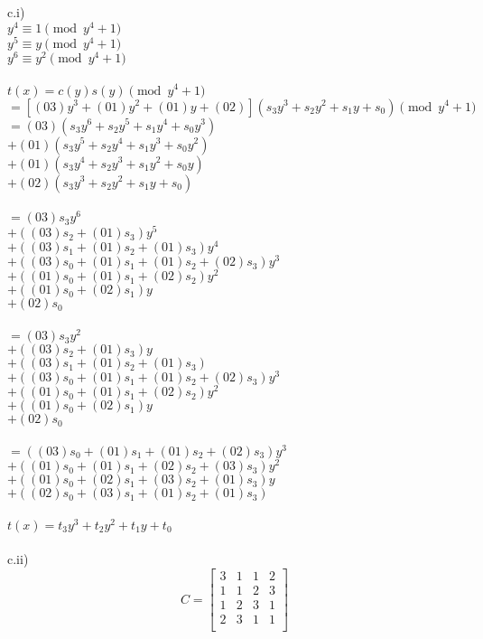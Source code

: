 \documentclass{assignment}
\begin{document}
\begin{problemlist}
\begin{problem}
\begin{answer}
c.i)\\
$y^4\equiv 1 \pmod {y^4+1}$\\
$y^5\equiv y \pmod {y^4+1}$\\
$y^6\equiv y^2 \pmod {y^4+1}$\\
\\
$t(x)=c(y)s(y) \pmod {y^4+1}$\\
$=[(03)y^3+(01)y^2+(01)y+(02)](s_3y^3+s_2y^2+s_1y+s_0) \pmod {y^4+1}$\\
$=(03)(s_3y^6+s_2y^5+s_1y^4+s_0y^3)$\\
$+(01)(s_3y^5+s_2y^4+s_1y^3+s_0y^2)$\\
$+(01)(s_3y^4+s_2y^3+s_1y^2+s_0y)$\\
$+(02)(s_3y^3+s_2y^2+s_1y+s_0)$\\
\\
$=(03)s_3y^6$\\
$+((03)s_2+(01)s_3)y^5$\\
$+((03)s_1+(01)s_2+(01)s_3)y^4$\\
$+((03)s_0+(01)s_1+(01)s_2+(02)s_3)y^3$\\
$+((01)s_0+(01)s_1+(02)s_2)y^2$\\
$+((01)s_0+(02)s_1)y$\\
$+(02)s_0$\\
\\
$=(03)s_3y^2$\\
$+((03)s_2+(01)s_3)y$\\
$+((03)s_1+(01)s_2+(01)s_3)$\\
$+((03)s_0+(01)s_1+(01)s_2+(02)s_3)y^3$\\
$+((01)s_0+(01)s_1+(02)s_2)y^2$\\
$+((01)s_0+(02)s_1)y$\\
$+(02)s_0$\\
\\
$=((03)s_0+(01)s_1+(01)s_2+(02)s_3)y^3$\\
$+((01)s_0+(01)s_1+(02)s_2+(03)s_3)y^2$\\
$+((01)s_0+(02)s_1+(03)s_2+(01)s_3)y$\\
$+((02)s_0+(03)s_1+(01)s_2+(01)s_3)$\\
\\
$t(x)=t_3y^3+t_2y^2+t_1y+t_0$\\
\\
c.ii)\\
\[
C=
\begin{bmatrix}
3 & 1 & 1 & 2 \\
1 & 1 & 2 & 3\\
1 & 2 & 3 & 1\\
2 & 3 & 1 & 1\\
\end{bmatrix}
\]
\\
\end{answer}
\end{problem}


\end{problemlist}
\end{document}
